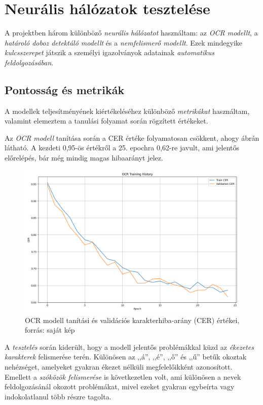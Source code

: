 \documentclass[
]{thesis-ekf}
\theoremstyle{definition}
\theoremstyle{remark}
\begin{document}
\section{Neurális hálózatok tesztelése} A projektben három különböző \emph{neurális hálózatot} használtam: az \emph{OCR modellt}, a \emph{határoló doboz detektáló modellt} és a \emph{nemfelismerő modellt}. Ezek mindegyike \emph{kulcsszerepet} játszik a személyi igazolványok adatainak \emph{automatikus feldolgozásában}.

\subsection{Pontosság és metrikák} A modellek teljesítményének kiértékeléséhez különböző \emph{metrikákat} használtam, valamint elemeztem a tanulási folyamat során rögzített értékeket.

Az \emph{OCR modell} tanítása során a CER értéke folyamatosan csökkent, ahogy  ábrán látható. A kezdeti 0,95-ös értékről a 25. epochra 0,62-re javult, ami jelentős előrelépés, bár még mindig magas hibaarányt jelez.

\begin{figure} \centering \includegraphics[width=\textwidth]{ocr_training_history} \caption{OCR modell tanítási és validációs karakterhiba-arány (CER) értékei, forrás: saját kép} \label{fig-ocr-training} \end{figure}

A \emph{tesztelés} során kiderült, hogy a modell jelentős problémákkal küzd az \emph{ékezetes karakterek} felismerése terén. Különösen az ,,á'', ,,é'', ,,ő'' és ,,ű'' betűk okoztak nehézséget, amelyeket gyakran ékezet nélküli megfelelőikként azonosított. Emellett a \emph{szóközök felismerése} is következetlen volt, ami különösen a nevek feldolgozásánál okozott problémákat, mivel ezeket gyakran egybeírta vagy indokolatlanul több részre tagolta.
\end{document}
